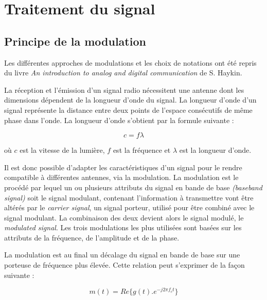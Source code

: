 \section{Traitement du signal}

\subsection{Principe de la modulation}\label{mod}

Les différentes approches de modulations et les choix de notations ont été repris du livre \textit{An introduction to analog and digital communication} de S. Haykin\cite{book1}.

\vspace{0.1cm}

La réception et l'émission d'un signal radio nécessitent une antenne dont les dimensions dépendent de la longueur d'onde du signal. La longueur d'onde d'un signal représente la distance entre deux points de l'espace consécutifs de même phase dans l'onde. La longueur d'onde s'obtient par la formule suivante :

\begin{equation}\label{eq1}
c = f \lambda
\end{equation}

où $c$ est la vitesse de la lumière, $f$ est la fréquence et $\lambda$ est la longueur d'onde.

\vspace{0.1cm}

Il est donc possible d'adapter les caractéristiques d'un signal pour le rendre compatible à différentes antennes, via la modulation. La modulation est le procédé par lequel un ou plusieurs attributs du signal en bande de base \textit{(baseband signal)} soit le signal modulant, contenant l'information à transmettre vont être altérés par le \textit{carrier signal}, un signal porteur, utilisé pour être combiné avec le signal modulant. La combinaison des deux devient alors le signal modulé, le \textit{modulated signal}. Les trois modulations les plus utilisées sont basées sur les attributs de la fréquence, de l'amplitude et de la phase.

\vspace{0.1cm}

La modulation est au final un décalage du signal en bande de base sur une porteuse de fréquence plus élevée. Cette relation peut s'exprimer de la façon suivante : 

\begin{equation}\label{eq110}
m(t) = Re\{ g(t).e^{-j2\pi f_c t}\}
\end{equation}

